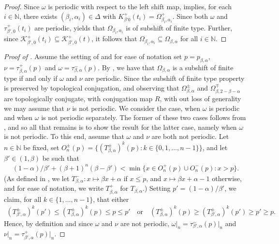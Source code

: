 \documentclass[a4paper,reqno,10pt]{amsart}
\begin{document}
\begin{proof}
Since $\omega$ is periodic with respect to the left shift map,  implies, for each $i \in \mathbb{N}$, there exists $(\beta_{i}, \alpha_{i}) \in \Delta$ with $K_{\beta'0}^+(t_i)=\Omega^+_{\beta_{i},\alpha_i}$. Since both $\omega$ and $\tau^{+}_{\beta',0}(t_i)$ are periodic,  yields that $\Omega_{\beta_{i},\alpha_i}$ is of subshift of finite type.  Further, since $\mathcal{K}_{\beta',0}^{+}(t_i) \subseteq \mathcal{K}^{+}_{\beta',0}(t)$, it follows that $\Omega_{\beta_{i},\alpha_{i}} \subseteq \Omega_{\beta,\alpha}$ for all $i \in \mathbb{N}$.
\end{proof}

\begin{proof}[{Proof of }]
Assume the setting of  and for ease of notation set $p = p_{\beta, \alpha}$, $\nu = \tau_{\beta, \alpha}^{+}(p)$ and $\omega = \tau_{\beta, \alpha}^{-}(p)$. By , we have that $\Omega_{\beta, \alpha}$ is a subshift of finite type if and only if $\omega$ and $\nu$ are periodic. Since the subshift of finite type property is preserved by topological conjugation, and observing that $\Omega^{\pm}_{\beta, \alpha}$ and $\Omega^{\mp}_{\beta, 2-\beta-\alpha}$ are topologically conjugate, with conjugation map $R$, with out loss of generality we may assume that $\nu$ is not periodic. We consider the case, when $\omega$ is periodic and when $\omega$ is not periodic separately.  The former of these two cases follows from , and so all that remains is to show the result for the latter case, namely when $\omega$ is not periodic. To this end, assume that $\omega$ and $\nu$ are both not periodic. Let $n \in \mathbb{N}$ be fixed, set $O_{n}^{\pm}(p) = \{ (T_{\beta, \alpha}^{\pm})^{k}(p) \colon k \in \{ 0, 1, \ldots, n-1 \} \}$, and let $\beta' \in (1, \beta)$ be such that
   \begin{align}\label{eq:def_beta_prime}
        (1-\alpha)/\beta' + (\beta+1)^{n}(\beta - \beta') < \min \{ x \in O_{n}^{+}(p) \cup O_{n}^{-}(p) \colon x > p \}.
    \end{align}
(As defined in , we let $T_{\beta,\alpha}^{-} \colon x \mapsto \beta x + \alpha$ if $x \leq p$, and $x \mapsto \beta x + \alpha - 1$ otherwise, and for ease of notation, we write $T_{\beta,\alpha}^{+}$ for $T_{\beta, \alpha}$.)  Setting $p' = (1-\alpha)/\beta'$, we claim, for all $k \in \{ 1, \ldots, n-1 \}$, that either
    \begin{align}\label{eq:desired_inequalities}
        (T_{\beta', \alpha}^{\pm})^{k}(p') \leq (T_{\beta, \alpha}^{\pm})^{k}(p) \leq p \leq p'
        \quad \text{or} \quad
        (T_{\beta, \alpha}^{\pm})^{k}(p) \geq (T_{\beta', \alpha}^{\pm})^{k}(p') \geq p' \geq p.
    \end{align}
Hence, by definition and since $\omega$ and $\nu$ are not periodic, $\omega\vert_{n} = \tau_{\beta', \alpha}^{-}(p)\vert_{n}$ and $\nu\vert_{n} = \tau_{\beta', \alpha}^{+}(p)\vert_{n}$.


\end{proof}
\end{document}
